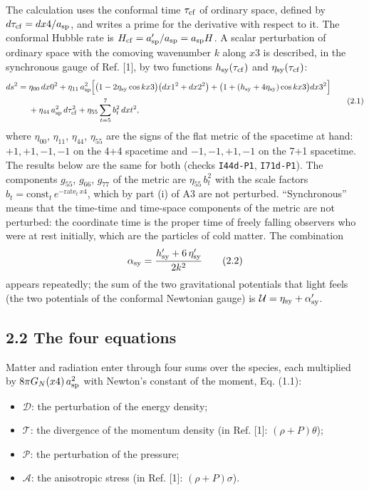 \documentclass[
  10pt,
]{article}
\providecommand{\tightlist}{%
  \setlength{\itemsep}{0pt}\setlength{\parskip}{0pt}}
\begin{document}
The calculation uses the conformal time \(\tau_{\rm cf}\) of ordinary
space, defined by \(d\tau_{\rm cf}=dx4/a_{\rm sp}\), and writes a prime
for the derivative with respect to it. The conformal Hubble rate is
\(H_{\rm cf}=a_{\rm sp}'/a_{\rm sp}=a_{\rm sp}H\). A scalar perturbation
of ordinary space with the comoving wavenumber \(k\) along \(x3\) is
described, in the synchronous gauge of Ref. {[}1{]}, by two functions
\(h_{\rm sy}(\tau_{\rm cf})\) and \(\eta_{\rm sy}(\tau_{\rm cf})\):
\[\begin{aligned}ds^2={}&\eta_{00}\,dx0^2+\eta_{11}\,a_{\rm sp}^2\Big[\big(1-2\eta_{\rm sy}\cos kx3\big)\big(dx1^2+dx2^2\big)+\big(1+(h_{\rm sy}+4\eta_{\rm sy})\cos kx3\big)dx3^2\Big]\\&+\eta_{44}\,a_{\rm sp}^2\,d\tau_{\rm cf}^2+\eta_{55}\sum_{t=5}^{7}b_t^2\,dxt^2 ,\end{aligned}\tag{2.1}\]
where \(\eta_{00}\), \(\eta_{11}\), \(\eta_{44}\), \(\eta_{55}\) are the
signs of the flat metric of the spacetime at hand: \(+1,+1,-1,-1\) on
the 4+4 spacetime and \(-1,-1,+1,-1\) on the 7+1 spacetime. The results
below are the same for both (checks \texttt{I44d-P1}, \texttt{I71d-P1}).
The components \(g_{55}\), \(g_{66}\), \(g_{77}\) of the metric are
\(\eta_{55}\,b_t^2\) with the scale factors
\(b_t=\mathrm{const}_t\,e^{-\mathrm{rate}_t\,x4}\), which by part (i) of
A3 are not perturbed. ``Synchronous'' means that the time-time and
time-space components of the metric are not perturbed: the coordinate
time is the proper time of freely falling observers who were at rest
initially, which are the particles of cold matter. The combination
\[\alpha_{\rm sy}=\frac{h_{\rm sy}'+6\,\eta_{\rm sy}'}{2k^2}\tag{2.2}\]
appears repeatedly; the sum of the two gravitational potentials that
light feels (the two potentials of the conformal Newtonian gauge) is
\(\mathcal U=\eta_{\rm sy}+\alpha_{\rm sy}'\).

\hypertarget{the-four-equations}{%
\subsection{2.2 The four equations}\label{the-four-equations}}

Matter and radiation enter through four sums over the species, each
multiplied by \(8\pi G_N(x4)\,a_{\rm sp}^2\) with Newton's constant of
the moment, Eq. (1.1):

\begin{itemize}
\tightlist
\item
  \(\mathcal D\): the perturbation of the energy density;
\item
  \(\mathcal T\): the divergence of the momentum density (in Ref.
  {[}1{]}: \((\rho+P)\theta\));
\item
  \(\mathcal P\): the perturbation of the pressure;
\item
  \(\mathcal A\): the anisotropic stress (in Ref. {[}1{]}:
  \((\rho+P)\sigma\)).
\end{itemize}
\end{document}
